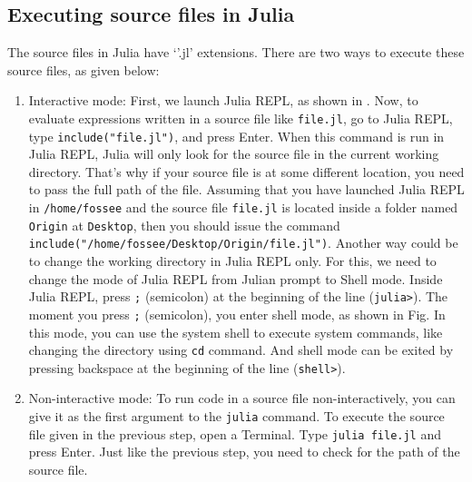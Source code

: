 \subsection{Executing source files in Julia} \label{julia-execution}
The source files in Julia have  `'.jl' extensions. There are two ways to execute 
these source files, as given below: 

\begin{enumerate}
      \item Interactive mode: First, we launch Julia REPL, as shown in 
            . Now, to evaluate expressions written in a source file 
            like {\tt file.jl}, go to Julia REPL, type {\tt include("file.jl")}, and press Enter. 
            When this command is run in Julia REPL, Julia will only look for the source 
            file in the current working directory. That's why if your source file is at 
            some different location, you need to pass the full path of the file. 
            Assuming that you have launched Julia REPL in {\tt /home/fossee} and the 
            source file {\tt file.jl} is located inside a folder named {\tt Origin} at {\tt Desktop},
            then you should issue the command
            {\tt include("/home/fossee/Desktop/Origin/file.jl")}. Another way could be to 
            change the working directory in Julia REPL only. For this, we need to 
            change the mode of Julia REPL from Julian prompt to Shell mode. Inside Julia REPL,
            press {\tt ;} (semicolon) at the beginning of the line ({\tt julia>}). 
            The moment you press {\tt ;} (semicolon), you enter shell mode, as shown in Fig. 
            In this mode, you can use the system shell to execute system commands, like 
            changing the directory using {\tt cd} command. And shell mode can be exited by 
            pressing backspace at the beginning of the line ({\tt shell>}).
      \item Non-interactive mode: To run code in a source file non-interactively, 
            you can give it as the first argument to the {\tt julia} command. To execute 
            the source file given in the previous step, open a Terminal. Type 
            {\tt julia file.jl} and press Enter. Just like the previous step, you need to check for the 
            path of the source file.  
\end{enumerate}

